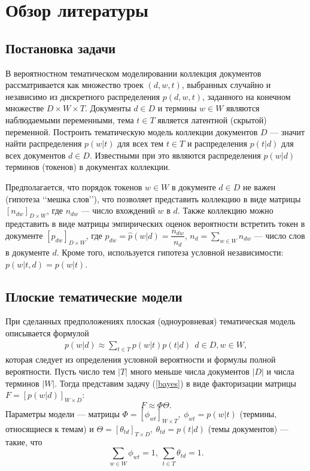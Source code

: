 \chapter{Обзор литературы}

\section{Постановка задачи}
В вероятностном тематическом моделировании коллекция документов рассматривается как множество троек $(d, w, t)$, выбранных случайно и независимо из дискретного распределения $p(d, w, t)$, заданного на конечном множестве $D \times W \times T$. Документы $d \in  D$ и термины $w \in W$ являются наблюдаемыми переменными, 
тема $t \in T$ является латентной (скрытой) переменной. Построить тематическую модель коллекции документов $D$ — значит найти
распределения $p(w |t)$ для всех тем $t \in T$ и распределения $p(t| d)$  для всех документов $d \in  D$. Известными при это являются распределения $p(w|d)$ терминов 
(токенов) в документах коллекции.

Предполагается, что порядок токенов $w \in W$ в документе $d \in D$ не важен (гипотеза \lq\lq{мешка слов}\rq\rq{}), что позволяет представить коллекцию в виде матрицы $[n_{dw} ]_{D \times W}$, где $n_{dw}$ --- число вхождений $w$ в $d$. Также коллекцию можно представить в виде матрицы эмпирических оценок вероятности встретить токен в документе $[p_{dw}]_{D\times W}$, где $p_{dw}=\hat p(w|d) = \dfrac {n_{dw}}{n_d}$, $n_d = \sum\limits_{w \in W} n_{dw}$ --- число слов в документе $d$. Кроме того, используется гипотеза условной независимости: $p(w|t,d)=p(w|t)$.

\section{Плоские тематические модели}
При сделанных предположениях плоская (одноуровневая) тематическая модель описывается формулой 
\begin{align} 
p(w|d) \approx \sum\limits_{t \in T}  p(w|t)p(t|d) \ \ d\in D, w \in W, \tag{*}\label{bayes}
\end{align}
которая следует из определения условной вероятности и формулы полной вероятности.
Пусть число тем $|T|$ много меньше числа документов $|D|$ и числа терминов $|W|$. Тогда представим задачу (\ref{bayes}) в виде факторизации матрицы $F =[p(w|d)]_{W \times D} $: $$F \approx \Phi \Theta.$$
Параметры модели --- матрицы $\Phi = [\phi_{wt}]_{W \times T}, \ \phi_{wt}=p(w|t)$ (термины, относящиеся к темам) и $\Theta = [\theta_{td}]_{T \times D}, \ \theta_{td}=p(t|d)$ (темы документов) --- такие, что $$\sum\limits_{w \in W} \phi_{wt} = 1, \ \sum\limits_{t \in T} \theta_{td} = 1.$$ 

